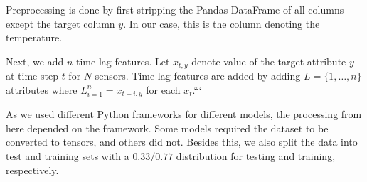 Preprocessing is done by first stripping the Pandas DataFrame of all columns except the target column $y$. In our case, this is the column denoting the temperature.

Next, we add $n$ time lag features. Let $x_{t,y}$ denote value of the target attribute $y$ at time step $t$ for $N$ sensors. 
Time lag features are added by adding $L=\{1,\dots, n\}$ attributes where $L_{i=1}^n=x_{t-i, y}$ for each $x_{t}$.```

As we used different Python frameworks for different models, the processing from here depended on the framework. Some models required the dataset to be converted to tensors, and others did not.
Besides this, we also split the data into test and training sets with a $0.33/0.77$ distribution for testing and training, respectively.